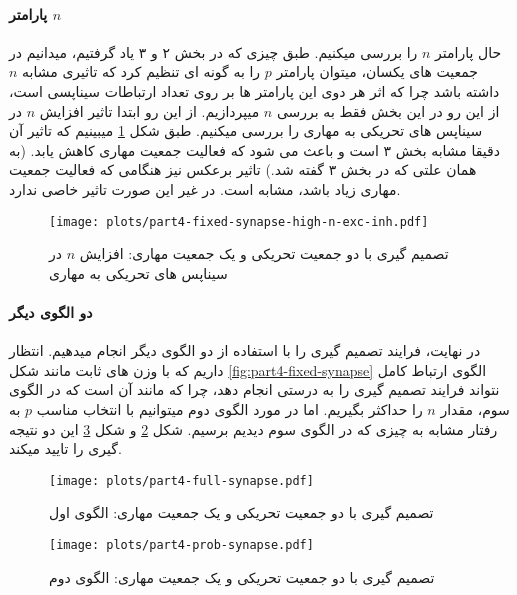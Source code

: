     \paragraph*{پارامتر $n$}
    حال پارامتر 
    $n$ 
    را بررسی میکنیم. طبق چیزی که در بخش ۲ و ۳ یاد گرفتیم، میدانیم در جمعیت های یکسان، میتوان پارامتر 
    $p$ 
    را به گونه ای تنظیم کرد که تاثیری مشابه 
    $n$ 
    داشته باشد چرا که اثر هر دوی این پارامتر ها بر روی تعداد ارتباطات سیناپسی است، از این رو در این بخش فقط به بررسی 
    $n$ 
    میپردازیم.
    از این رو ابتدا تاثیر افزایش 
    $n$ 
    در سیناپس های تحریکی به مهاری را بررسی میکنیم. طبق شکل
    \ref{fig:part4-fixed-synapse-high-n-exc-inh.}
    میبینیم که تاثیر آن دقیقا مشابه بخش ۳ است و باعث می شود که فعالیت جمعیت مهاری کاهش یابد.
    (به همان علتی که در بخش ۳ گفته شد.) 
    تاثیر برعکس نیز هنگامی که فعالیت جمعیت مهاری زیاد باشد، مشابه است. در غیر این صورت تاثیر خاصی ندارد.
    \begin{figure}[!ht]
        \centering
        \texttt{[image: plots/part4-fixed-synapse-high-n-exc-inh.pdf]} 
        \caption{تصمیم گیری با دو جمعیت تحریکی و یک جمعیت مهاری: افزایش $n$ در سیناپس های تحریکی به مهاری}
        \label{fig:part4-fixed-synapse-high-n-exc-inh.}
    \end{figure}

    \paragraph*{دو الگوی دیگر}
        در نهایت، فرایند تصمیم گیری را با استفاده از دو الگوی دیگر انجام میدهیم. انتظار داریم که با وزن های ثابت مانند شکل 
        \ref{fig:part4-fixed-synapse}
        الگوی ارتباط کامل نتواند فرایند تصمیم گیری را به درستی انجام دهد، چرا که مانند آن است که در الگوی سوم، مقدار
        $n$ 
        را حداکثر بگیریم. اما در مورد الگوی دوم میتوانیم با انتخاب مناسب 
        $p$ 
        به رفتار مشابه به چیزی که در الگوی سوم دیدیم برسیم. شکل 
        \ref{fig:part4-full-synapse} و 
        شکل \ref{fig:part4-prob-synapse}
        این دو نتیجه گیری را تایید میکند.
        \begin{figure}[!ht]
            \centering
            \texttt{[image: plots/part4-full-synapse.pdf]} 
            \caption{تصمیم گیری با دو جمعیت تحریکی و یک جمعیت مهاری: الگوی اول}
            \label{fig:part4-full-synapse}
        \end{figure}
        \begin{figure}[!ht]
            \centering
            \texttt{[image: plots/part4-prob-synapse.pdf]} 
            \caption{تصمیم گیری با دو جمعیت تحریکی و یک جمعیت مهاری: الگوی دوم}
            \label{fig:part4-prob-synapse}
        \end{figure}
